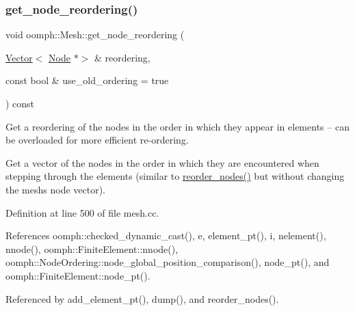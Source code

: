 \mbox{\label{classoomph_1_1Mesh_a789c4299395952c482ee9569e172d584}} 
\subsubsection{\texorpdfstring{get\+\_\+node\+\_\+reordering()}{get\_node\_reordering()}}
{\footnotesize\ttfamily void oomph\+::\+Mesh\+::get\+\_\+node\+\_\+reordering (\begin{DoxyParamCaption}\item[{\hyperlink{classoomph_1_1Vector}{Vector}$<$ \hyperlink{classoomph_1_1Node}{Node} $\ast$$>$ \&}]{reordering,  }\item[{const bool \&}]{use\+\_\+old\+\_\+ordering = {\ttfamily true} }\end{DoxyParamCaption}) const\hspace{0.3cm}{\ttfamily [virtual]}}



Get a reordering of the nodes in the order in which they appear in elements -- can be overloaded for more efficient re-\/ordering. 

Get a vector of the nodes in the order in which they are encountered when stepping through the elements (similar to \hyperlink{classoomph_1_1Mesh_a801e77424d1bf8a35c9bba055230f1e3}{reorder\+\_\+nodes()} but without changing the mesh\textquotesingle{}s node vector). 

Definition at line 500 of file mesh.\+cc.



References oomph\+::checked\+\_\+dynamic\+\_\+cast(), e, element\+\_\+pt(), i, nelement(), nnode(), oomph\+::\+Finite\+Element\+::nnode(), oomph\+::\+Node\+Ordering\+::node\+\_\+global\+\_\+position\+\_\+comparison(), node\+\_\+pt(), and oomph\+::\+Finite\+Element\+::node\+\_\+pt().



Referenced by add\+\_\+element\+\_\+pt(), dump(), and reorder\+\_\+nodes().

\mbox{\label{classoomph_1_1Mesh_a1cd4a4f29adcf4d401625141e15cde28}} 
